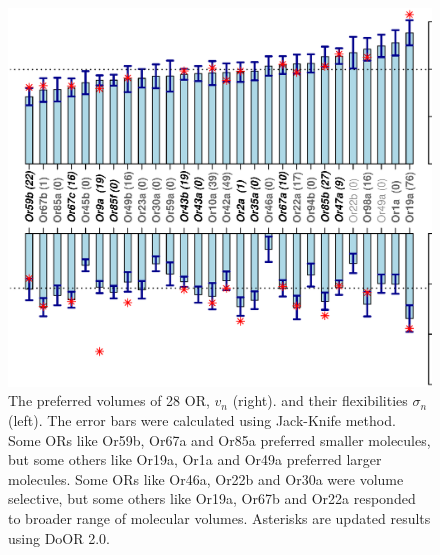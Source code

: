 \documentclass[fleqn,10pt]{wlscirep} %
\newcommand{\numberofreceptors}{ 28 }
\begin{document}
\begin{figure}
		\centering
		\includegraphics[height= 1  \textwidth , angle=-90]{mean-std-vol-}

	\caption{The preferred volumes of \numberofreceptors OR, $v_n$ (right). 
		and their flexibilities $\sigma_n$ (left). 
		The error bars were calculated using Jack-Knife method. 
		Some ORs like Or59b, Or67a and  Or85a preferred smaller molecules, 
		but some others like Or19a,  Or1a and  Or49a preferred larger molecules.
		Some ORs like Or46a,  Or22b and Or30a were volume  selective, 
		but some others like Or19a,  Or67b and  Or22a responded to broader range of molecular volumes.
		Asterisks are updated results using DoOR 2.0.
		}
		\label{fig:preferred_volume}
\end{figure}
\end{document}
